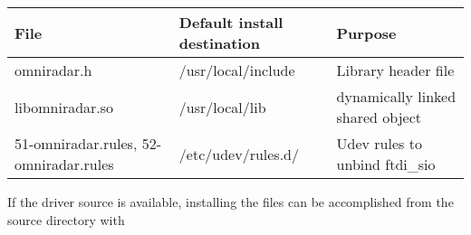 \begin{longtable}[]{@{}lll@{}}
\toprule
\begin{minipage}[b]{0.06\columnwidth}\raggedright\strut
File\strut
\end{minipage} & \begin{minipage}[b]{0.15\columnwidth}\raggedright\strut
Default install destination\strut
\end{minipage} & \begin{minipage}[b]{0.10\columnwidth}\raggedright\strut
Purpose\strut
\end{minipage}\tabularnewline
\midrule
\endhead
\begin{minipage}[t]{0.06\columnwidth}\raggedright\strut
omniradar.h\strut
\end{minipage} & \begin{minipage}[t]{0.15\columnwidth}\raggedright\strut
/usr/local/include\strut
\end{minipage} & \begin{minipage}[t]{0.10\columnwidth}\raggedright\strut
Library header file\strut
\end{minipage}\tabularnewline
\begin{minipage}[t]{0.06\columnwidth}\raggedright\strut
libomniradar.so\strut
\end{minipage} & \begin{minipage}[t]{0.15\columnwidth}\raggedright\strut
/usr/local/lib\strut
\end{minipage} & \begin{minipage}[t]{0.10\columnwidth}\raggedright\strut
dynamically linked shared object\strut
\end{minipage}\tabularnewline
\begin{minipage}[t]{0.06\columnwidth}\raggedright\strut
51-omniradar.rules, 52-omniradar.rules\strut
\end{minipage} & \begin{minipage}[t]{0.15\columnwidth}\raggedright\strut
/etc/udev/rules.d/\strut
\end{minipage} & \begin{minipage}[t]{0.10\columnwidth}\raggedright\strut
Udev rules to unbind ftdi\_sio\strut
\end{minipage}\tabularnewline
\bottomrule
\end{longtable}

If the driver source is available, installing the files can be
accomplished from the source directory with

\begin{Shaded}
\begin{Highlighting}[]
\KeywordTok{\&\&} 
\end{Highlighting}
\end{Shaded}

